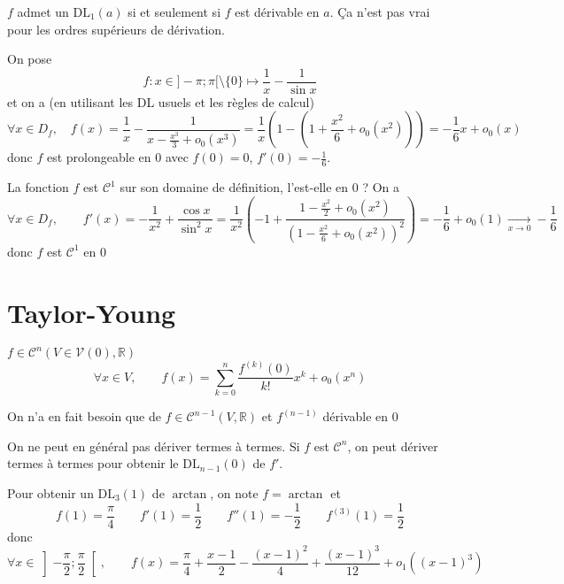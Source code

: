 \begin{rem}
    $f$ admet un $\mathrm{DL}_1(a)$ si et seulement si $f$ est dérivable en $a$. Ça n'est pas vrai pour les ordres supérieurs de dérivation.
\end{rem}

\begin{ex}
    On pose \[
        f: x\in]-\pi;\pi[\setminus\{0\} \longmapsto \frac 1x-\frac1{\sin x}
    \]
    et on a (en utilisant les DL usuels et les règles de calcul) \[
        \forall x\in D_f,\quad f(x)=\frac1x-\frac1{x-\frac{x^3}3+o_0(x^3)}=\frac1x \left( 1- \left( 1+\frac {x^2}6+o_0(x^2) \right)\right)=-\frac16x+o_0(x)
    \]
    donc $f$ est prolongeable en $0$ avec $f(0)=0$, $f'(0)=-\frac 16$.

    La fonction $f$ est $\mathcal C^1$ sur son domaine de définition, l'est-elle en $0$ ? On a \[
        \forall x\in D_f, \qquad f'(x)=-\frac1{x^2}+\frac{\cos x}{\sin^2x}=\frac1{x^2} \left( -1+\frac{1-\frac{x^2}2+o_0(x^2)}{(1-\frac{x^2}6+o_0(x^2))^2} \right)=-\frac16+o_0(1)\xrightarrow[x\to 0]{}-\frac16
    \]
    donc $f$ est $\mathcal C^1$ en $0$
\end{ex}

\section{Taylor-Young}

\begin{thm}
    \Hyp $f\in\mathcal C^n(V\in\mathcal V(0), \mathbb R)$
    \Conc \[
            \forall x\in V, \qquad f(x)=\sum_{k=0}^n\frac{f^{(k)}(0)}{k!}x^k+o_0(x^n)
    \]
\end{thm}

\begin{rem}
    On n'a en fait besoin que de $f\in\mathcal C^{n-1}(V, \mathbb R)$ et $f^{(n-1)}$ dérivable en $0$
\end{rem}

\begin{rem}
    On ne peut en général pas dériver termes à termes. Si $f$ est $\mathcal C^n$, on peut dériver termes à termes pour obtenir le $\mathrm{DL}_{n-1}(0)$ de $f'$.
\end{rem}

\begin{ex}[$a$]
    Pour obtenir un $\mathrm{DL}_3(1)$ de $\arctan$, on note $f=\arctan$ et \[
        f(1)=\frac\pi4\qquad f'(1)=\frac12\qquad f''(1)=-\frac12\qquad f^{(3)}(1)=\frac1{2}
    \]
    donc \[
        \forall x\in \left]-\frac\pi2;\frac\pi2  \right[, \qquad f(x)=\frac\pi4+\frac{x-1}2-\frac{(x-1)^2}4+\frac{(x-1)^3}{12}+o_1((x-1)^3)
    \]
\end{ex}

